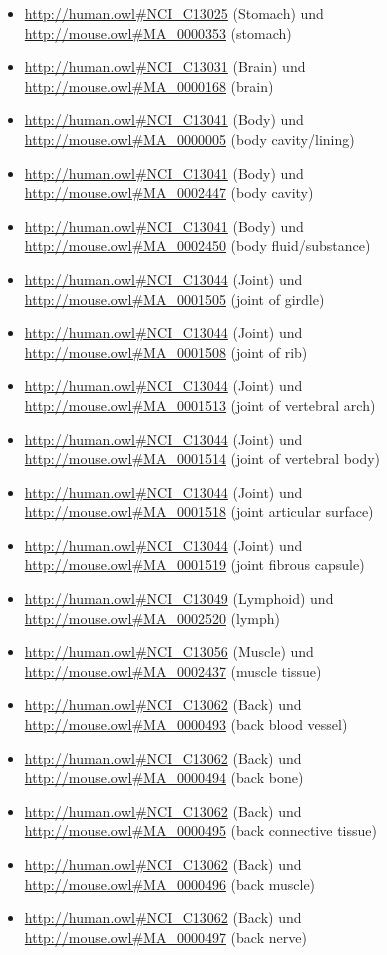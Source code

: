 \begin{itemize}
	\item \url{http://human.owl#NCI_C13025} (Stomach\textunderscorePart) und \url{http://mouse.owl#MA_0000353} (stomach)
	\item \url{http://human.owl#NCI_C13031} (Brain\textunderscorePart) und \url{http://mouse.owl#MA_0000168} (brain)
	\item \url{http://human.owl#NCI_C13041} (Body) und \url{http://mouse.owl#MA_0000005} (body cavity/lining)
	\item \url{http://human.owl#NCI_C13041} (Body) und \url{http://mouse.owl#MA_0002447} (body cavity)
	\item \url{http://human.owl#NCI_C13041} (Body) und \url{http://mouse.owl#MA_0002450} (body fluid/substance)
	\item \url{http://human.owl#NCI_C13044} (Joint) und \url{http://mouse.owl#MA_0001505} (joint of girdle)
	\item \url{http://human.owl#NCI_C13044} (Joint) und \url{http://mouse.owl#MA_0001508} (joint of rib)
	\item \url{http://human.owl#NCI_C13044} (Joint) und \url{http://mouse.owl#MA_0001513} (joint of vertebral arch)
	\item \url{http://human.owl#NCI_C13044} (Joint) und \url{http://mouse.owl#MA_0001514} (joint of vertebral body)
	\item \url{http://human.owl#NCI_C13044} (Joint) und \url{http://mouse.owl#MA_0001518} (joint articular surface)
	\item \url{http://human.owl#NCI_C13044} (Joint) und \url{http://mouse.owl#MA_0001519} (joint fibrous capsule)
	\item \url{http://human.owl#NCI_C13049} (Lymphoid\textunderscoreTissue) und \url{http://mouse.owl#MA_0002520} (lymph)
	\item \url{http://human.owl#NCI_C13056} (Muscle) und \url{http://mouse.owl#MA_0002437} (muscle tissue)
	\item \url{http://human.owl#NCI_C13062} (Back) und \url{http://mouse.owl#MA_0000493} (back blood vessel)
	\item \url{http://human.owl#NCI_C13062} (Back) und \url{http://mouse.owl#MA_0000494} (back bone)
	\item \url{http://human.owl#NCI_C13062} (Back) und \url{http://mouse.owl#MA_0000495} (back connective tissue)
	\item \url{http://human.owl#NCI_C13062} (Back) und \url{http://mouse.owl#MA_0000496} (back muscle)
	\item \url{http://human.owl#NCI_C13062} (Back) und \url{http://mouse.owl#MA_0000497} (back nerve)

\end{itemize}
